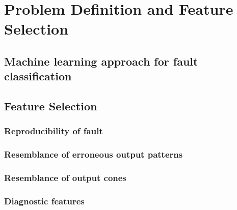\chapter{Problem Definition and Feature Selection}
\label{chap:chapter4}
\section{Machine learning approach for fault classification}

\section{Feature Selection}

\subsection{Reproducibility of fault}

\subsection{Resemblance of erroneous output patterns}

\subsection{Resemblance of output cones}

\subsection{Diagnostic features}


